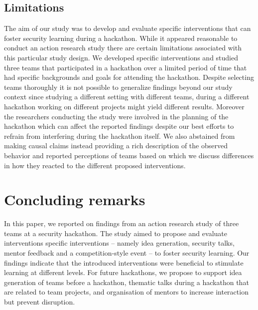 \documentclass[runningheads]{llncs}
\begin{document}
\subsection{Limitations}
The aim of our study was to develop and evaluate specific interventions that can foster security learning during a hackathon. While it appeared reasonable to conduct an action research study \cite{lewin1946action} there are certain limitations associated with this particular study design. We developed specific interventions and studied three teams that participated in a hackathon over a limited period of time that had specific backgrounds and goals for attending the hackathon. Despite selecting teams thoroughly it is not possible to generalize findings beyond our study context since studying a different setting with different teams, during a different hackathon working on different projects might yield different results. Moreover the researchers conducting the study were involved in the planning of the hackathon which can affect the reported findings despite our best efforts to refrain from interfering during the hackathon itself. We also abstained from making causal claims instead providing a rich description of the observed behavior and reported perceptions of teams based on which we discuss differences in how they reacted to the different proposed interventions.

\section{Concluding remarks}
In this paper, we reported on findings from an action research study of three teams at a security hackathon. The study aimed to propose and evaluate interventions specific interventions -- namely idea generation, security talks, mentor feedback and a competition-style event -- to foster security learning. Our findings indicate that the introduced interventions were beneficial to stimulate learning at different levels. For future hackathons, we propose to support idea generation of teams before a hackathon, thematic talks during a hackathon that are related to team projects, and organisation of mentors to increase interaction but prevent disruption. 




\end{document}
